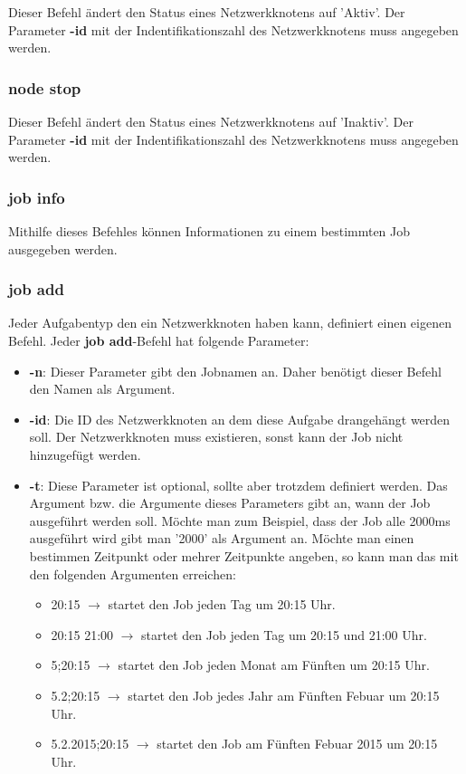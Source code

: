 \documentclass[12pt,a4paper]{report}
\begin{document}
Dieser Befehl ändert den Status eines Netzwerkknotens auf 'Aktiv'. Der Parameter \textbf{-id} mit der Indentifikationszahl des Netzwerkknotens muss angegeben werden.

\subsubsection{node stop}

Dieser Befehl ändert den Status eines Netzwerkknotens auf 'Inaktiv'. Der Parameter \textbf{-id} mit der Indentifikationszahl des Netzwerkknotens muss angegeben werden.

\subsubsection{job info}

Mithilfe dieses Befehles können Informationen zu einem bestimmten Job ausgegeben werden.

\subsubsection{job add}

Jeder Aufgabentyp den ein Netzwerkknoten haben kann, definiert einen eigenen Befehl. Jeder \textbf{job add}-Befehl hat folgende Parameter:

\begin{itemize}
\item \textbf{-n}: Dieser Parameter gibt den Jobnamen an. Daher benötigt dieser Befehl den Namen als Argument.
\item \textbf{-id}: Die ID des Netzwerkknoten an dem diese Aufgabe drangehängt werden soll. Der Netzwerkknoten muss existieren, sonst kann der Job nicht hinzugefügt werden.
\item \textbf{-t}: Diese Parameter ist optional, sollte aber trotzdem definiert werden. Das Argument bzw. die Argumente dieses Parameters gibt an, wann der Job ausgeführt werden soll. Möchte man zum Beispiel, dass der Job alle 2000ms ausgeführt wird gibt man '2000' als Argument an. Möchte man einen bestimmen Zeitpunkt oder mehrer Zeitpunkte angeben, so kann man das mit den folgenden Argumenten erreichen:
  \begin{itemize}
  \item 20:15 $\rightarrow$ startet den Job jeden Tag um 20:15 Uhr.
  \item 20:15 21:00 $\rightarrow$ startet den Job jeden Tag um 20:15 und 21:00 Uhr.
  \item 5;20:15 $\rightarrow$ startet den Job jeden Monat am Fünften um 20:15 Uhr.
  \item 5.2;20:15 $\rightarrow$ startet den Job jedes Jahr am Fünften Febuar um 20:15 Uhr.
  \item 5.2.2015;20:15 $\rightarrow$ startet den Job am Fünften Febuar 2015 um 20:15 Uhr.
  \end{itemize}
\end{itemize}
\end{document}
